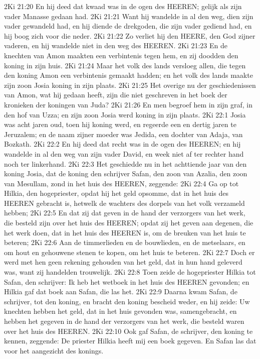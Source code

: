 2Ki 21:20  En hij deed dat kwaad was in de ogen des HEEREN; gelijk als zijn vader Manasse gedaan had.
2Ki 21:21  Want hij wandelde in al den weg, dien zijn vader gewandeld had, en hij diende de drekgoden, die zijn vader gediend had, en hij boog zich voor die neder.
2Ki 21:22  Zo verliet hij den HEERE, den God zijner vaderen, en hij wandelde niet in den weg des HEEREN.
2Ki 21:23  En de knechten van Amon maakten een verbintenis tegen hem, en zij doodden den koning in zijn huis.
2Ki 21:24  Maar het volk des lands versloeg allen, die tegen den koning Amon een verbintenis gemaakt hadden; en het volk des lands maakte zijn zoon Josia koning in zijn plaats.
2Ki 21:25  Het overige nu der geschiedenissen van Amon, wat hij gedaan heeft, zijn die niet geschreven in het boek der kronieken der koningen van Juda?
2Ki 21:26  En men begroef hem in zijn graf, in den hof van Uzza; en zijn zoon Josia werd koning in zijn plaats.
2Ki 22:1  Josia was acht jaren oud, toen hij koning werd, en regeerde een en dertig jaren te Jeruzalem; en de naam zijner moeder was Jedida, een dochter van Adaja, van Bozkath.
2Ki 22:2  En hij deed dat recht was in de ogen des HEEREN; en hij wandelde in al den weg van zijn vader David, en week niet af ter rechter hand noch ter linkerhand.
2Ki 22:3  Het geschiedde nu in het achttiende jaar van den koning Josia, dat de koning den schrijver Safan, den zoon van Azalia, den zoon van Mesullam, zond in het huis des HEEREN, zeggende:
2Ki 22:4  Ga op tot Hilkia, den hogepriester, opdat hij het geld opsomme, dat in het huis des HEEREN gebracht is, hetwelk de wachters des dorpels van het volk verzameld hebben;
2Ki 22:5  En dat zij dat geven in de hand der verzorgers van het werk, die besteld zijn over het huis des HEEREN; opdat zij het geven aan degenen, die het werk doen, dat in het huis des HEEREN is, om de breuken van het huis te beteren;
2Ki 22:6  Aan de timmerlieden en de bouwlieden, en de metselaars, en om hout en gehouwene stenen te kopen, om het huis te beteren.
2Ki 22:7  Doch er werd met hen geen rekening gehouden van het geld, dat in hun hand geleverd was, want zij handelden trouwelijk.
2Ki 22:8  Toen zeide de hogepriester Hilkia tot Safan, den schrijver: Ik heb het wetboek in het huis des HEEREN gevonden; en Hilkia gaf dat boek aan Safan, die las het.
2Ki 22:9  Daarna kwam Safan, de schrijver, tot den koning, en bracht den koning bescheid weder, en hij zeide: Uw knechten hebben het geld, dat in het huis gevonden was, samengebracht, en hebben het gegeven in de hand der verzorgers van het werk, die besteld waren over het huis des HEEREN.
2Ki 22:10  Ook gaf Safan, de schrijver, den koning te kennen, zeggende: De priester Hilkia heeft mij een boek gegeven. En Safan las dat voor het aangezicht des konings.

